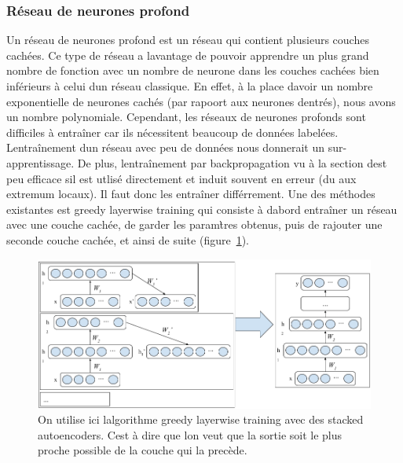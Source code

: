 \documentclass[11pt]{sdm}
\begin{document}
			\medbreak

		\subsubsection{R\'eseau de neurones profond}
		\label{seq:DeepNetwork}
			Un r\'eseau de neurones profond est un r\'eseau qui contient plusieurs couches cach\'ees. Ce type de r\'eseau a l\textquotesingle avantage de pouvoir apprendre un plus grand nombre de fonction avec un nombre de neurone dans les couches cach\'ees bien inf\'erieurs \`a celui d\textquotesingle un r\'eseau classique. En effet, \`a la place d\textquotesingle avoir un nombre exponentielle de neurones cach\'es (par rapoort aux neurones d\textquotesingle entr\'es), nous avons un nombre polynomiale.
			Cependant, les r\'eseaux de neurones profonds sont difficiles \`a entra\^iner car ils n\'ecessitent beaucoup de donn\'ees label\'ees. L\textquotesingle entra\^inement d\textquotesingle un r\'eseau avec peu de donn\'ees nous donnerait un sur-apprentissage. De plus, l\textquotesingle entra\^inement par backpropagation vu \`a la section d\textquotesingle est peu efficace s\textquotesingle il est utlis\'e directement et induit souvent en erreur (du aux extremum locaux). Il faut donc les entra\^iner diff\'errement.
			Une des m\'ethodes existantes est greedy layerwise training qui consiste \`a d\textquotesingle abord entra\^iner un r\'eseau avec une couche cach\'ee, de garder les param\`tres obtenus, puis de rajouter une seconde couche cach\'ee, et ainsi de suite (figure~\ref{fig:trainDeepNet}).

			\begin{figure}[!ht]
				\centering
				\includegraphics[scale=0.5,natwidth=919,natheight=412]{figures/trainDeepNetByGreedyLayerWise.png}
				\caption{On utilise ici l\textquotesingle algorithme greedy layerwise training avec des stacked autoencoders. C\textquotesingle est \`a dire que l\textquotesingle on veut que la sortie soit le plus proche possible de la couche qui la prec\`ede.}
				\label{fig:trainDeepNet}
			\end{figure}
\end{document}
